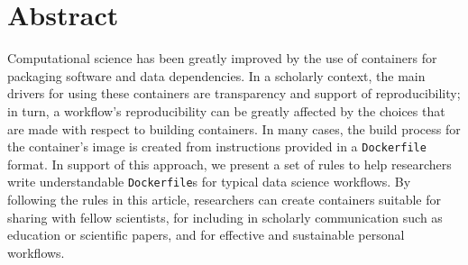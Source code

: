 \documentclass[10pt,letterpaper]{article}
\newcommand{\getIndex}[2]{
  \ForEach{,}{\IfEq{#1}{\thislevelitem}{\number\thislevelcount\ExitForEach}{}}{#2}
}
\newcommand{\getAff}[1]{
  \getIndex{#1}{}
}
\begin{document}
\vspace*{0.2in}

\section*{Abstract}
Computational science has been greatly improved by the use of containers
for packaging software and data dependencies. In a scholarly context,
the main drivers for using these containers are transparency and support
of reproducibility; in turn, a workflow's reproducibility can be greatly
affected by the choices that are made with respect to building
containers. In many cases, the build process for the container's image
is created from instructions provided in a \texttt{Dockerfile} format.
In support of this approach, we present a set of rules to help
researchers write understandable \texttt{Dockerfile}s for typical data
science workflows. By following the rules in this article, researchers
can create containers suitable for sharing with fellow scientists, for
including in scholarly communication such as education or scientific
papers, and for effective and sustainable personal workflows.
\end{document}
